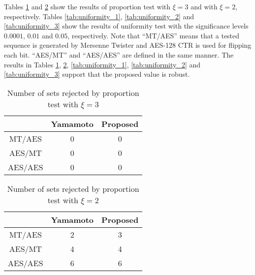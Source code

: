 \documentclass[dvipdfmx,english]{ampmt} %
\begin{document}
Tables \ref{tab:proportion_1} and \ref{tab:proportion_2} show the results of proportion test with $\xi=3$ and with $\xi=2$, respectively. Tables \ref{tab:uniformity_1}, \ref{tab:uniformity_2} and \ref{tab:uniformity_3} show the results of uniformity test with the significance levels $0.0001$, $0.01$ and $0.05$, respectively. Note that ``MT/AES'' means that a tested sequence is generated by Mersenne Twister and AES-128 CTR is used for flipping each bit. ``AES/MT'' and ``AES/AES'' are defined in the same manner.
The results in Tables \ref{tab:proportion_1}, \ref{tab:proportion_2}, \ref{tab:uniformity_1}, \ref{tab:uniformity_2} and \ref{tab:uniformity_3} support that the proposed value is robust.
\begin{table}[htb]
  \centering
  \caption{Number of sets rejected by proportion test with $\xi=3$}
  \begin{tabular}{ccc} \hline
              & Yamamoto \cite{yamamoto2016highly}  & Proposed \\ \hline 
    MT/AES    & 0         & 0        \\
    AES/MT    & 0         & 0        \\
    AES/AES   & 0         & 0        \\ \hline 
  \end{tabular}
  \label{tab:proportion_1}
\end{table}
\begin{table}[htb]
  \centering
  \caption{Number of sets rejected by proportion test with $\xi=2$}
  \begin{tabular}{ccc} \hline
              & Yamamoto \cite{yamamoto2016highly} & Proposed \\ \hline 
    MT/AES    & 2         & 3        \\
    AES/MT    & 4         & 4        \\
    AES/AES   & 6         & 6        \\ \hline 
  \end{tabular}
  \label{tab:proportion_2}
\end{table}
\end{document}
